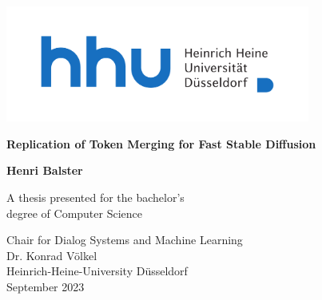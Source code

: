 \begin{titlepage}
    \centering
    \includegraphics[width=10cm]{static/Logo_HHU_+Name_horizontal_4c_+Safezone}\\

    \vspace*{2cm}

    \huge
    \textbf{Replication of Token Merging for Fast Stable Diffusion}
    
    \Large
    \vspace{1cm}
    
            
    \vspace{1.5cm}

    \textbf{Henri Balster}

    \large
    \vfill
            
    A thesis presented for the bachelor's\\
    degree of Computer Science
            
    \vspace{1cm}
            
    Chair for Dialog Systems and Machine Learning\\
    Dr. Konrad Völkel\\
    Heinrich-Heine-University Düsseldorf\\
    \vspace*{1cm}
    September 2023
            
\end{titlepage}